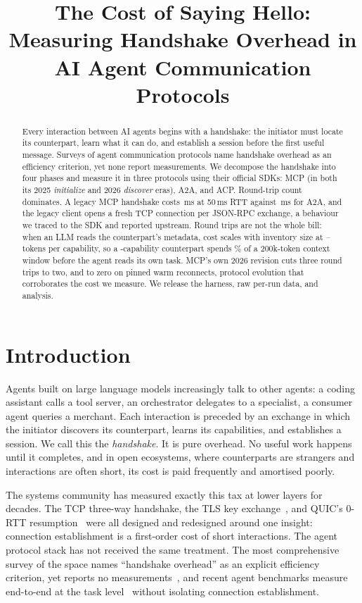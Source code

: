 \documentclass{article}
\title{The Cost of Saying Hello: Measuring Handshake Overhead in AI Agent
Communication Protocols}
\begin{document}
\maketitle

\begin{abstract}
Every interaction between AI agents begins with a handshake: the initiator
must locate its counterpart, learn what it can do, and establish a session
before the first useful message. Surveys of agent communication protocols
name handshake overhead as an efficiency criterion, yet none report
measurements. We decompose the handshake into four phases and measure it in
three protocols using their official SDKs: MCP (in both its 2025
\emph{initialize} and 2026 \emph{discover} eras), A2A, and ACP. Round-trip
count dominates. A legacy MCP handshake costs \SOneMcpLegacyRttMed{}\,ms at
50\,ms RTT against \SOneAtoaRttMed{}\,ms for A2A, and the legacy client
opens a fresh TCP connection per JSON-RPC exchange, a behaviour we traced
to the SDK and reported upstream. Round trips are not the whole bill: when
an LLM reads the counterpart's metadata, cost scales with inventory size at
\InvPerCapAtoa{}--\InvPerCapAcp{} tokens per capability, so a
\InvMaxN{}-capability counterpart spends \InvMaxCtxPct{}\% of a 200k-token
context window before the agent reads its own task. MCP's own 2026 revision
cuts three round trips to two, and to zero on pinned warm reconnects,
protocol evolution that corroborates the cost we measure. We release the
harness, raw per-run data, and analysis.
\end{abstract}

\section{Introduction}
\label{sec:intro}

Agents built on large language models increasingly talk to other agents: a
coding assistant calls a tool server, an orchestrator delegates to a
specialist, a consumer agent queries a merchant. Each interaction is
preceded by an exchange in which the initiator discovers its counterpart,
learns its capabilities, and establishes a session. We call this the
\emph{handshake}. It is pure overhead. No useful work happens until it
completes, and in open ecosystems, where counterparts are strangers and
interactions are often short, its cost is paid frequently and amortised
poorly.

The systems community has measured exactly this tax at lower layers for
decades. The TCP three-way handshake, the TLS key
exchange~\citep{rescorla2018tls,naylor2014cost}, and QUIC's 0-RTT
resumption~\citep{iyengar2021quic} were all designed and redesigned around
one insight: connection establishment is a first-order cost of short
interactions. The agent protocol stack has not received the same treatment.
The most comprehensive survey of the space names ``handshake overhead'' as
an explicit efficiency criterion, yet reports no
measurements~\citep{yang2025survey}, and recent agent benchmarks measure
end-to-end at the task level~\citep{du2026protocolbench,
dobrovolskyi2026empirical} without isolating connection establishment.
\end{document}
